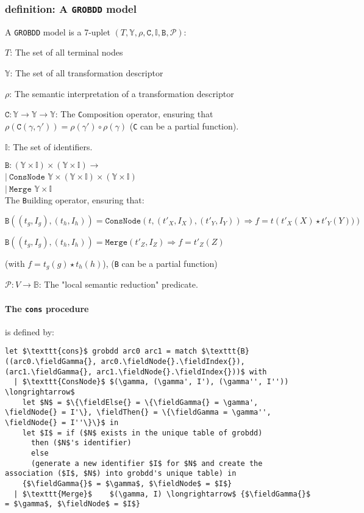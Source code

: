 \documentclass[a4paper,10pt]{article}
\newcommand{\B}{\mathbb{B}}
\newcommand{\Y}{\mathbb{Y}}
\newcommand{\I}{\mathbb{I}}
\newcommand{\GroBdd}{\texttt{GROBDD}}
\newcommand{\fieldIndex}{\texttt{index}}
\newcommand{\fieldNode}{\texttt{node}}
\newcommand{\fieldGamma}{\mathtt{\gamma}}
\newcommand{\fieldThen}{\mathtt{if1}}
\newcommand{\fieldElse}{\mathtt{if0}}
\begin{document}
\subsubsection{definition: A \GroBdd{} model}
{
A \GroBdd{} model is a 7-uplet $(T, \Y, \rho, \texttt{C}, \I, \texttt{B}, \mathcal{P})$:
\begin{compactenum}
\item $T$: The set of all terminal nodes
\item $\Y$: The set of all transformation descriptor
\item $\rho$: The semantic interpretation of a transformation descriptor
\item $\texttt{C}: \Y \longrightarrow \Y \longrightarrow \Y$: The \texttt{C}omposition operator, ensuring that $\rho(\texttt{C}(\gamma, \gamma')) = \rho(\gamma')\circ\rho(\gamma)$ (\texttt{C} can be a partial function).
\item $\I$: The set of identifiers.
\item $\mathtt{B}: (\Y\times\I)\times(\Y\times\I) \longrightarrow$\\
 $|~\texttt{ConsNode}$ $\Y\times (\Y\times\I) \times (\Y\times\I)$\\
 $|~\texttt{Merge}$ $\Y\times\I$\\
The \texttt{B}uilding operator, ensuring that:\begin{compactenum}
\item $\texttt{B}((t_g, I_g), (t_h, I_h))= \texttt{ConsNode} (t, (t'_X, I_X), (t'_Y, I_Y)) \Rightarrow f = t\left(t'_X(X) \star t'_Y(Y))\right)$
\item $\texttt{B}((t_g, I_g), (t_h, I_h))= \texttt{Merge} (t'_Z, I_Z) \Rightarrow f = t'_Z(Z)$
\end{compactenum}
(with $f = t_g(g) \star t_h(h)$), (\texttt{B} can be a partial function)
\item $\mathcal{P}: V\longrightarrow\B$: The "local semantic reduction" predicate.
\end{compactenum}
}

\paragraph{The \texttt{cons} procedure} is defined by:
\begin{lstlisting}
let $\texttt{cons}$ grobdd arc0 arc1 = match $\texttt{B}((arc0.\fieldGamma{}, arc0.\fieldNode{}.\fieldIndex{}), (arc1.\fieldGamma{}, arc1.\fieldNode{}.\fieldIndex{}))$ with
  | $\texttt{ConsNode}$ $(\gamma, (\gamma', I'), (\gamma'', I'')) \longrightarrow$
    let $N$ = $\{\fieldElse{} = \{\fieldGamma{} = \gamma', \fieldNode{} = I'\}, \fieldThen{} = \{\fieldGamma = \gamma'', \fieldNode{} = I''\}\}$ in
    let $I$ = if ($N$ exists in the unique table of grobdd)
      then ($N$'s identifier)
      else
      (generate a new identifier $I$ for $N$ and create the association ($I$, $N$) into grobdd's unique table) in
    {$\fieldGamma{}$ = $\gamma$, $\fieldNode$ = $I$}
  | $\texttt{Merge}$    $(\gamma, I) \longrightarrow$ {$\fieldGamma{}$ = $\gamma$, $\fieldNode$ = $I$}
\end{lstlisting}
\end{document}
